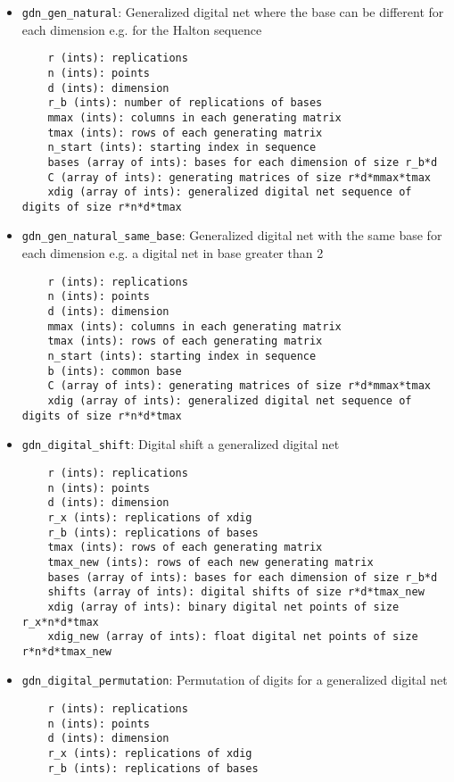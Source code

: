 \begin{itemize}
\begin{lstlisting}
\end{lstlisting}
\item
\texttt{gdn\_gen\_natural}: 
Generalized digital net where the base can be different for each dimension e.g. for the Halton sequence
\begin{lstlisting}
	r (ints): replications
    n (ints): points
    d (ints): dimension
    r_b (ints): number of replications of bases
    mmax (ints): columns in each generating matrix
    tmax (ints): rows of each generating matrix
    n_start (ints): starting index in sequence
    bases (array of ints): bases for each dimension of size r_b*d
    C (array of ints): generating matrices of size r*d*mmax*tmax
    xdig (array of ints): generalized digital net sequence of digits of size r*n*d*tmax
\end{lstlisting}
\item
\texttt{gdn\_gen\_natural\_same\_base}: 
Generalized digital net with the same base for each dimension e.g. a digital net in base greater than 2
\begin{lstlisting}
	r (ints): replications
    n (ints): points
    d (ints): dimension
    mmax (ints): columns in each generating matrix
    tmax (ints): rows of each generating matrix
    n_start (ints): starting index in sequence
    b (ints): common base
    C (array of ints): generating matrices of size r*d*mmax*tmax
    xdig (array of ints): generalized digital net sequence of digits of size r*n*d*tmax
\end{lstlisting}
\item
\texttt{gdn\_digital\_shift}: 
Digital shift a generalized digital net
\begin{lstlisting}
	r (ints): replications
    n (ints): points
    d (ints): dimension
    r_x (ints): replications of xdig
    r_b (ints): replications of bases
    tmax (ints): rows of each generating matrix
    tmax_new (ints): rows of each new generating matrix
    bases (array of ints): bases for each dimension of size r_b*d
    shifts (array of ints): digital shifts of size r*d*tmax_new
    xdig (array of ints): binary digital net points of size r_x*n*d*tmax
    xdig_new (array of ints): float digital net points of size r*n*d*tmax_new
\end{lstlisting}
\item
\texttt{gdn\_digital\_permutation}: 
Permutation of digits for a generalized digital net
\begin{lstlisting}
	r (ints): replications
    n (ints): points
    d (ints): dimension
    r_x (ints): replications of xdig
    r_b (ints): replications of bases

\end{lstlisting}
\end{itemize}
